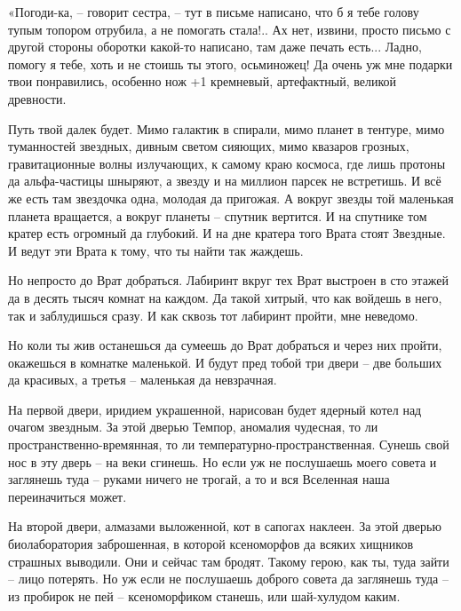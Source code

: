 \documentclass[ebook,oneside,final,openright]{memoir}
\begin{document}
\par
«Погоди-ка, – говорит сестра, – тут в письме написано, что б я тебе голову тупым топором отрубила, а не помогать стала!.. Ах нет, извини, просто письмо с другой стороны оборотки какой-то написано, там даже печать есть... Ладно, помогу я тебе, хоть и не стоишь ты этого, осьминожец! Да очень уж мне подарки твои понравились, особенно нож +1 кремневый, артефактный, великой древности.\par
\par
Путь твой далек будет. Мимо галактик в спирали, мимо планет в тентуре, мимо туманностей звездных, дивным светом сияющих, мимо квазаров грозных, гравитационные волны излучающих, к самому краю космоса, где лишь протоны да альфа-частицы шныряют, а звезду и на миллион парсек не встретишь. И всё же есть там звездочка одна, молодая да пригожая. А вокруг звезды той маленькая планета вращается, а вокруг планеты – спутник вертится. И на спутнике том кратер есть огромный да глубокий. И на дне кратера того Врата стоят Звездные. И ведут эти Врата к тому, что ты найти так жаждешь.\par
\par
Но непросто до Врат добраться. Лабиринт вкруг тех Врат выстроен в сто этажей да в десять тысяч комнат на каждом. Да такой хитрый, что как войдешь в него, так и заблудишься сразу. И как сквозь тот лабиринт пройти, мне неведомо.\par
\par
Но коли ты жив останешься да сумеешь до Врат добраться и через них пройти, окажешься в комнатке маленькой. И будут пред тобой три двери – две больших да красивых, а третья – маленькая да невзрачная.\par
\par
На первой двери, иридием украшенной, нарисован будет ядерный котел над очагом звездным. За этой дверью Темпор, аномалия чудесная, то ли пространственно-времянная, то ли температурно-пространственная. Сунешь свой нос в эту дверь – на веки сгинешь. Но если уж не послушаешь моего совета и заглянешь туда – руками ничего не трогай, а то и вся Вселенная наша переиначиться может.\par
\par
На второй двери, алмазами выложенной, кот в сапогах наклеен. За этой дверью биолаборатория заброшенная, в которой ксеноморфов да всяких хищников страшных выводили. Они и сейчас там бродят. Такому герою, как ты, туда зайти – лицо потерять. Но уж если не послушаешь доброго совета да заглянешь туда – из пробирок не пей – ксеноморфиком станешь, или шай-хулудом каким.\par
\end{document}
